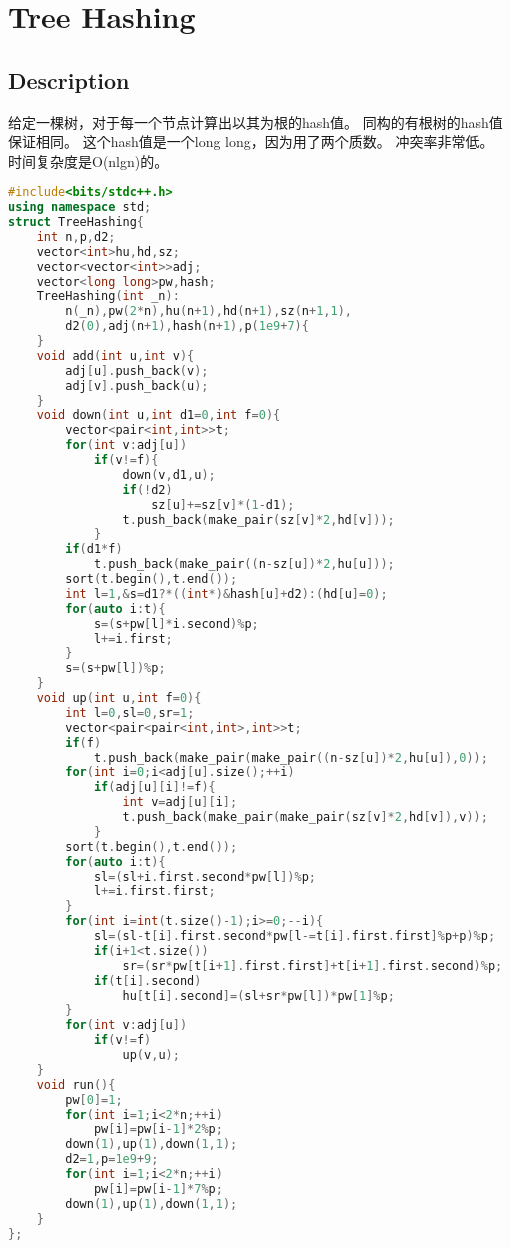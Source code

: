\documentclass{book}
\begin{document}
\section{Tree Hashing}

\subsection*{Description}
给定一棵树，对于每一个节点计算出以其为根的hash值。
同构的有根树的hash值保证相同。
这个hash值是一个long long，因为用了两个质数。
冲突率非常低。
时间复杂度是O(nlgn)的。
\begin{lstlisting}[language=C++,title={Tree Hashing.hpp (1689 bytes, 71 lines)}]
#include<bits/stdc++.h>
using namespace std;
struct TreeHashing{
	int n,p,d2;
	vector<int>hu,hd,sz;
	vector<vector<int>>adj;
	vector<long long>pw,hash;
	TreeHashing(int _n):
		n(_n),pw(2*n),hu(n+1),hd(n+1),sz(n+1,1),
		d2(0),adj(n+1),hash(n+1),p(1e9+7){
	}
	void add(int u,int v){
		adj[u].push_back(v);
		adj[v].push_back(u);
	}
	void down(int u,int d1=0,int f=0){
		vector<pair<int,int>>t;
		for(int v:adj[u])
			if(v!=f){
				down(v,d1,u);
				if(!d2)
					sz[u]+=sz[v]*(1-d1);
				t.push_back(make_pair(sz[v]*2,hd[v]));
			}
		if(d1*f)
			t.push_back(make_pair((n-sz[u])*2,hu[u]));
		sort(t.begin(),t.end());
		int l=1,&s=d1?*((int*)&hash[u]+d2):(hd[u]=0);
		for(auto i:t){
			s=(s+pw[l]*i.second)%p;
			l+=i.first;
		}
		s=(s+pw[l])%p;
	}
	void up(int u,int f=0){
		int l=0,sl=0,sr=1;
		vector<pair<pair<int,int>,int>>t;
		if(f)
			t.push_back(make_pair(make_pair((n-sz[u])*2,hu[u]),0));
		for(int i=0;i<adj[u].size();++i)
			if(adj[u][i]!=f){
				int v=adj[u][i];
				t.push_back(make_pair(make_pair(sz[v]*2,hd[v]),v));
			}
		sort(t.begin(),t.end());
		for(auto i:t){
			sl=(sl+i.first.second*pw[l])%p;
			l+=i.first.first;
		}
		for(int i=int(t.size()-1);i>=0;--i){
			sl=(sl-t[i].first.second*pw[l-=t[i].first.first]%p+p)%p;
			if(i+1<t.size())
				sr=(sr*pw[t[i+1].first.first]+t[i+1].first.second)%p;
			if(t[i].second)
				hu[t[i].second]=(sl+sr*pw[l])*pw[1]%p;
		}
		for(int v:adj[u])
			if(v!=f)
				up(v,u);
	}
	void run(){
		pw[0]=1;
		for(int i=1;i<2*n;++i)
			pw[i]=pw[i-1]*2%p;
		down(1),up(1),down(1,1);
		d2=1,p=1e9+9;
		for(int i=1;i<2*n;++i)
			pw[i]=pw[i-1]*7%p;
		down(1),up(1),down(1,1);
	}
};\end{lstlisting}
\end{document}
